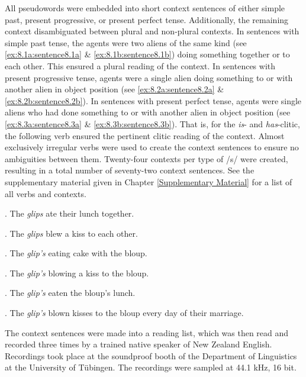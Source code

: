 All pseudowords were embedded into short context sentences of either simple past, present progressive, or present perfect tense. Additionally, the remaining context disambiguated between plural and non-plural contexts. In sentences with simple past tense, the agents were two aliens of the same kind (see \ref{ex:8.1a:sentence8.1a} \& \ref{ex:8.1b:sentence8.1b}) doing something together or to each other. This ensured a plural reading of the context. In sentences with present progressive tense, agents were a single alien doing something to or with another alien in object position (see \ref{ex:8.2a:sentence8.2a} \& \ref{ex:8.2b:sentence8.2b}). In sentences with present perfect tense, agents were single aliens who had done something to or with another alien in object position (see \ref{ex:8.3a:sentence8.3a} \& \ref{ex:8.3b:sentence8.3b}). That is, for the \textit{is}- and \textit{has}-clitic, the following verb ensured the pertinent clitic reading of the context. Almost exclusively irregular verbs were used to create the context sentences to ensure no ambiguities between them. Twenty-four contexts per type of /s/ were created, resulting in a total number of seventy-two context sentences. See the supplementary material given in Chapter \ref{Supplementary Material} for a list of all verbs and contexts.

\ex.
\label{ex:8.1a:sentence8.1a}
	The \textit{glips} ate their lunch together.
	
\ex.
\label{ex:8.1b:sentence8.1b}
	The \textit{glips} blew a kiss to each other.

\ex.
\label{ex:8.2a:sentence8.2a}
	The \textit{glip’s} eating cake with the bloup. 

\ex.
\label{ex:8.2b:sentence8.2b}
	The \textit{glip’s} blowing a kiss to the bloup.
	
\ex.
\label{ex:8.3a:sentence8.3a}
    The \textit{glip’s} eaten the bloup’s lunch.
	
\ex.
\label{ex:8.3b:sentence8.3b}
	The \textit{glip’s} blown kisses to the bloup every day of their marriage.

The context sentences were made into a reading list, which was then read and recorded three times by a trained native speaker of New Zealand English. Recordings took place at the soundproof booth of the Department of Linguistics at the University of Tübingen. The recordings were sampled at 44.1 kHz, 16 bit.

